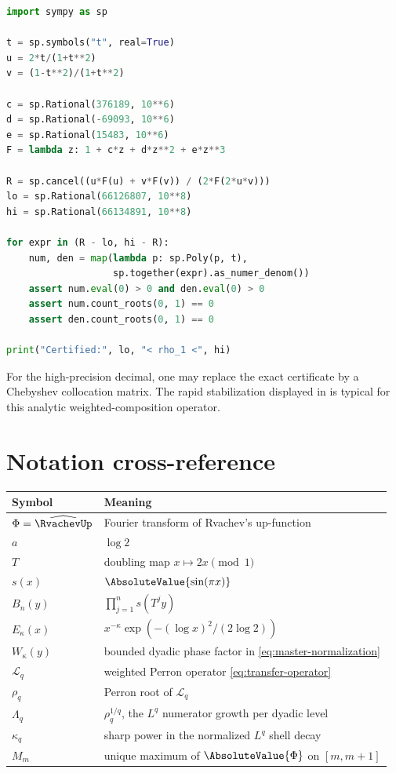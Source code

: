 \documentclass[11pt,oneside]{article}
\theoremstyle{definition}
\theoremstyle{remark}
\newcommand{\Phiup}{\Phi}
\begin{document}
\begin{lstlisting}[style=code,language=Python]
import sympy as sp

t = sp.symbols("t", real=True)
u = 2*t/(1+t**2)
v = (1-t**2)/(1+t**2)

c = sp.Rational(376189, 10**6)
d = sp.Rational(-69093, 10**6)
e = sp.Rational(15483, 10**6)
F = lambda z: 1 + c*z + d*z**2 + e*z**3

R = sp.cancel((u*F(u) + v*F(v)) / (2*F(2*u*v)))
lo = sp.Rational(66126807, 10**8)
hi = sp.Rational(66134891, 10**8)

for expr in (R - lo, hi - R):
    num, den = map(lambda p: sp.Poly(p, t),
                   sp.together(expr).as_numer_denom())
    assert num.eval(0) > 0 and den.eval(0) > 0
    assert num.count_roots(0, 1) == 0
    assert den.count_roots(0, 1) == 0

print("Certified:", lo, "< rho_1 <", hi)
\end{lstlisting}

For the high-precision decimal, one may replace the exact certificate by a Chebyshev
collocation matrix.  The rapid stabilization displayed in  is typical
for this analytic weighted-composition operator.

\section{Notation cross-reference}
\label{app:notation}

\begin{center}
\begin{tabularx}{\textwidth}{@{}lX@{}}
\toprule
Symbol & Meaning\\
\midrule
$\Phiup=\widehat{\RvachevUp}$ & Fourier transform of Rvachev's up-function\\
$a$ & $\log2$\\
$T$ & doubling map $x\mapsto2x\pmod1$\\
$s(x)$ & $\AbsoluteValue{\sin(\pi x)}$\\
$B_n(y)$ & $\prod_{j=1}^n s(T^jy)$\\
$E_\kappa(x)$ & $x^{-\kappa}\exp(- (\log x)^2/(2\log2))$\\
$W_\kappa(y)$ & bounded dyadic phase factor in \eqref{eq:master-normalization}\\
$\mathcal L_q$ & weighted Perron operator \eqref{eq:transfer-operator}\\
$\rho_q$ & Perron root of $\mathcal L_q$\\
$\Lambda_q$ & $\rho_q^{1/q}$, the $L^q$ numerator growth per dyadic level\\
$\kappa_q$ & sharp power in the normalized $L^q$ shell decay\\
$M_m$ & unique maximum of $\AbsoluteValue{\Phiup}$ on $[m,m+1]$\\
\bottomrule
\end{tabularx}
\end{center}
\end{document}
